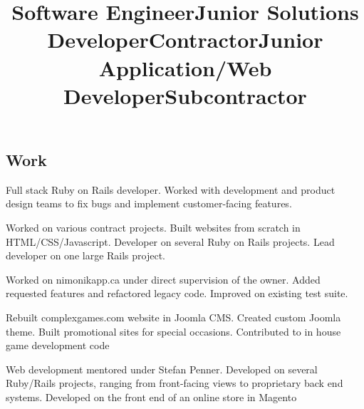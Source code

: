\documentclass[margin,line,letterpaper]{resume}
\begin{document}
\begin{resume}
  \section{\mysidestyle Work}

  \title{\bf Software Engineer}
  \location{}
  \begin{position}
    Full stack Ruby on Rails developer. Worked with development and
    product design teams to fix bugs and implement customer-facing
    features.
  \end{position}

  \title{\bf Junior Solutions Developer}
  \location{}
  \begin{position}
    Worked on various contract projects. Built websites from scratch
    in HTML/CSS/Javascript. Developer on several Ruby on Rails
    projects. Lead developer on one large Rails project.
  \end{position}

  \title{\bf Contractor}
  \location{}
  \begin{position}
    Worked on nimonikapp.ca under direct supervision of the owner.
    Added requested features and refactored legacy code. Improved
    on existing test suite. 
  \end{position}

  \title{\bf Junior Application/Web Developer}
  \location{}
  \begin{position}
    Rebuilt complexgames.com website in Joomla CMS. Created custom
    Joomla theme. Built promotional sites for special occasions. 
    Contributed to in house game development code
  \end{position}

  \title{\bf Subcontractor}
  \location{}
  \begin{position}
    Web development mentored under Stefan Penner. Developed on several 
    Ruby/Rails projects, ranging from front-facing views to proprietary
    back end systems. Developed on the front end of an online store in Magento
  \end{position}
\end{resume}
\end{document}
